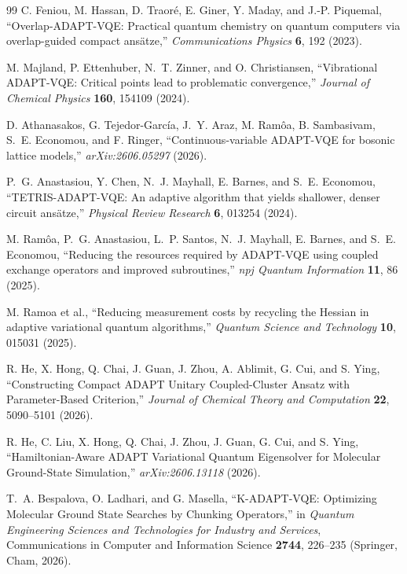 \documentclass[
  reprint,
  amsmath,
  amssymb,
  aps,
  pra,
  nofootinbib,
  superscriptaddress,
  floatfix
]{revtex4-2}
\begin{document}
\begin{thebibliography}{99}
C. Feniou, M. Hassan, D. Traor\'e, E. Giner, Y. Maday, and J.-P. Piquemal,
``Overlap-ADAPT-VQE: Practical quantum chemistry on quantum computers via overlap-guided compact ans\"atze,''
\emph{Communications Physics} \textbf{6}, 192 (2023).

M. Majland, P. Ettenhuber, N.~T. Zinner, and O. Christiansen,
``Vibrational ADAPT-VQE: Critical points lead to problematic convergence,''
\emph{Journal of Chemical Physics} \textbf{160}, 154109 (2024).

D. Athanasakos, G. Tejedor-Garc\'ia, J.~Y. Araz, M. Ram\^oa, B. Sambasivam, S.~E. Economou, and F. Ringer,
``Continuous-variable ADAPT-VQE for bosonic lattice models,''
\emph{arXiv:2606.05297} (2026).

P.~G. Anastasiou, Y. Chen, N.~J. Mayhall, E. Barnes, and S.~E. Economou,
``TETRIS-ADAPT-VQE: An adaptive algorithm that yields shallower, denser circuit ans\"atze,''
\emph{Physical Review Research} \textbf{6}, 013254 (2024).

M. Ram\^oa, P.~G. Anastasiou, L.~P. Santos, N.~J. Mayhall, E. Barnes, and S.~E. Economou,
``Reducing the resources required by ADAPT-VQE using coupled exchange operators and improved subroutines,''
\emph{npj Quantum Information} \textbf{11}, 86 (2025).

M. Ramoa et al.,
``Reducing measurement costs by recycling the Hessian in adaptive variational quantum algorithms,''
\emph{Quantum Science and Technology} \textbf{10}, 015031 (2025).

R. He, X. Hong, Q. Chai, J. Guan, J. Zhou, A. Ablimit, G. Cui, and S. Ying,
``Constructing Compact ADAPT Unitary Coupled-Cluster Ansatz with Parameter-Based Criterion,''
\emph{Journal of Chemical Theory and Computation} \textbf{22}, 5090--5101 (2026).

R. He, C. Liu, X. Hong, Q. Chai, J. Zhou, J. Guan, G. Cui, and S. Ying,
``Hamiltonian-Aware ADAPT Variational Quantum Eigensolver for Molecular Ground-State Simulation,''
\emph{arXiv:2606.13118} (2026).

T.~A. Bespalova, O. Ladhari, and G. Masella,
``K-ADAPT-VQE: Optimizing Molecular Ground State Searches by Chunking Operators,''
in \emph{Quantum Engineering Sciences and Technologies for Industry and Services}, Communications in Computer and Information Science \textbf{2744}, 226--235 (Springer, Cham, 2026).


\end{thebibliography}
\end{document}
